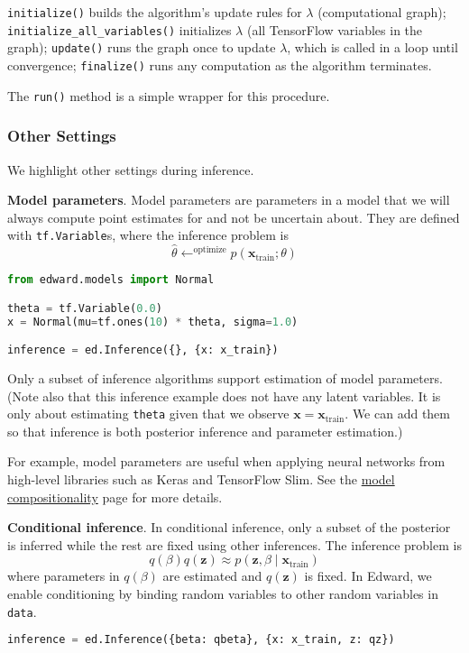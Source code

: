 \texttt{initialize()} builds the algorithm's update rules
for $\lambda$ (computational graph);
\texttt{initialize_all_variables()} initializes $\lambda$
(all TensorFlow variables in the graph);
\texttt{update()} runs the graph once to update
$\lambda$, which is called in a loop until convergence;
\texttt{finalize()} runs any computation as the algorithm
terminates.

The \texttt{run()} method is a simple wrapper for this procedure.

\subsubsection{Other Settings}

We highlight other settings during inference.

\textbf{Model parameters}.
Model parameters are parameters in a model that we will always compute
point estimates for and not be uncertain about.
They are defined with \texttt{tf.Variable}s, where the inference
problem is
\begin{equation*}
\hat{\theta} \leftarrow^{\text{optimize}}
p(\mathbf{x}_{\text{train}}; \theta)
\end{equation*}

\begin{lstlisting}[language=Python]
from edward.models import Normal

theta = tf.Variable(0.0)
x = Normal(mu=tf.ones(10) * theta, sigma=1.0)

inference = ed.Inference({}, {x: x_train})
\end{lstlisting}

Only a subset of inference algorithms support estimation of model
parameters.
(Note also that this inference example does not have any latent
variables. It is only about estimating \texttt{theta} given that we
observe $\mathbf{x} = \mathbf{x}_{\text{train}}$. We can add them so
that inference is both posterior inference and parameter estimation.)

For example, model parameters are useful when applying neural networks
from high-level libraries such as Keras and TensorFlow Slim. See
the \href{/api/model-compositionality}{model compositionality} page
for more details.

\textbf{Conditional inference}.
In conditional inference, only a subset of the posterior is inferred
while the rest are fixed using other inferences. The inference
problem is
\begin{equation*}
q(\beta)q(\mathbf{z})\approx
p(\mathbf{z}, \beta\mid\mathbf{x}_{\text{train}})
\end{equation*}
where parameters in $q(\beta)$ are estimated and $q(\mathbf{z})$ is
fixed.
%
In Edward, we enable conditioning by binding random variables to other
random variables in \texttt{data}.
\begin{lstlisting}[language=Python]
inference = ed.Inference({beta: qbeta}, {x: x_train, z: qz})
\end{lstlisting}

